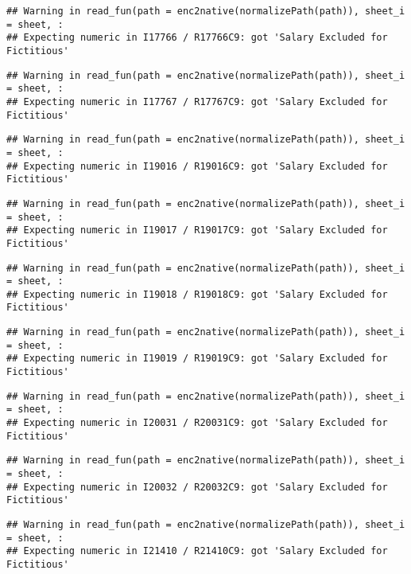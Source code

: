 \documentclass[
]{article}
\begin{document}
\begin{verbatim}
## Warning in read_fun(path = enc2native(normalizePath(path)), sheet_i = sheet, :
## Expecting numeric in I17766 / R17766C9: got 'Salary Excluded for Fictitious'
\end{verbatim}

\begin{verbatim}
## Warning in read_fun(path = enc2native(normalizePath(path)), sheet_i = sheet, :
## Expecting numeric in I17767 / R17767C9: got 'Salary Excluded for Fictitious'
\end{verbatim}

\begin{verbatim}
## Warning in read_fun(path = enc2native(normalizePath(path)), sheet_i = sheet, :
## Expecting numeric in I19016 / R19016C9: got 'Salary Excluded for Fictitious'
\end{verbatim}

\begin{verbatim}
## Warning in read_fun(path = enc2native(normalizePath(path)), sheet_i = sheet, :
## Expecting numeric in I19017 / R19017C9: got 'Salary Excluded for Fictitious'
\end{verbatim}

\begin{verbatim}
## Warning in read_fun(path = enc2native(normalizePath(path)), sheet_i = sheet, :
## Expecting numeric in I19018 / R19018C9: got 'Salary Excluded for Fictitious'
\end{verbatim}

\begin{verbatim}
## Warning in read_fun(path = enc2native(normalizePath(path)), sheet_i = sheet, :
## Expecting numeric in I19019 / R19019C9: got 'Salary Excluded for Fictitious'
\end{verbatim}

\begin{verbatim}
## Warning in read_fun(path = enc2native(normalizePath(path)), sheet_i = sheet, :
## Expecting numeric in I20031 / R20031C9: got 'Salary Excluded for Fictitious'
\end{verbatim}

\begin{verbatim}
## Warning in read_fun(path = enc2native(normalizePath(path)), sheet_i = sheet, :
## Expecting numeric in I20032 / R20032C9: got 'Salary Excluded for Fictitious'
\end{verbatim}

\begin{verbatim}
## Warning in read_fun(path = enc2native(normalizePath(path)), sheet_i = sheet, :
## Expecting numeric in I21410 / R21410C9: got 'Salary Excluded for Fictitious'
\end{verbatim}
\end{document}
